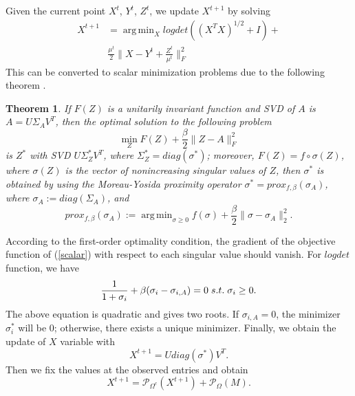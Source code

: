 \documentclass[letterpaper]{article}
\newtheorem{theorem}{Theorem}
\DeclareMathOperator*{\argmin}{arg\,min}
\begin{document}
Given the current point $X^t$, $Y^t$,  $Z^t$, we update $X^{t+1}$ by solving 
\begin{equation}
\begin{split}
X^{t+1}&=\argmin_{X} logdet ((X^TX)^{1/2}+I)+\\
&\frac{\mu^t}{2}\|X-Y^t+\frac{Z^t}{\mu^t}\|_F^2
\end{split}
\label{noncvx}
\end{equation}
This can be converted to scalar minimization problems due to the following theorem \cite{kang2015logdet}.  
\begin{theorem}
\label{thm}
If $F(Z)$ is a unitarily invariant function and SVD of $A$ is $A = U \Sigma_A V^T$, then the optimal solution to the following problem 
\begin{equation}
\min_{Z}F(Z)+\frac{\beta}{2}\|Z-A\|_F^{2}
\label{eq:Zobj}
\end{equation}
 is $Z^*$ with SVD $U\Sigma_Z^* V^T$, where $\Sigma_Z^* = diag\left(\sigma^*\right)$; moreover, $F(Z) = f \circ \sigma(Z)$, where $\sigma(Z)$ is the vector of nonincreasing  singular values of $Z$, %
 then $\sigma^*$ is obtained by using the Moreau-Yosida proximity operator
$\sigma^* = prox_{f, \beta} (\sigma_{A})$, where $\sigma_A := diag(\Sigma_A)$, and 
\begin{equation}
\label{scalar}
prox_{f, \beta} (\sigma_A) := \argmin_{\sigma\ge 0} f(\sigma) + \frac{\beta}{2}\|\sigma - \sigma_A\|_2^2.
\end{equation}
\end{theorem}
According to the first-order optimality condition, the gradient of the objective function of  (\ref{scalar}) with respect to each singular value should vanish.  
For $logdet$ function, we have 
\begin{equation}
\label{svdf}
\frac{1}{1+\sigma_i}+\beta (\sigma_{i}-\sigma_{i,A})=0\hspace{0.1cm} s.t. \hspace{0.1cm}\sigma_i \ge  0.%
\end{equation} 
The above equation is quadratic and gives two roots. If $\sigma_{i,A}=0$, the minimizer $\sigma_i^*$ will be 0; otherwise, there exists a unique minimizer. Finally, we obtain the update of $X$ variable with
\begin{equation}
X^{t+1}=U diag(\sigma^{*}) V^T.
\end{equation}
Then we fix the values at the observed entries and obtain
\begin{equation}
\label{solveJ}
X^{t+1}=\mathcal{P}_{\Omega^c}(X^{t+1})+\mathcal{P}_\Omega(M).
\end{equation}
\end{document}
